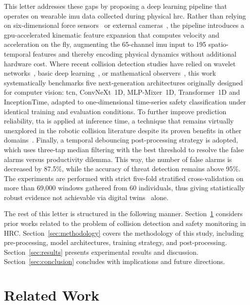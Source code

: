 \documentclass[letterpaper,journal]{IEEEtran}
\begin{document}
This letter addresses these gaps by proposing a deep learning pipeline that operates on wearable \ac{imu} data collected during physical \ac{hrc}. Rather than relying on six-dimensional force sensors~\cite{wang2025sixdof} or external cameras~\cite{hoang2024grasp}, the pipeline introduces a \ac{gpu}-accelerated kinematic feature expansion that computes velocity and acceleration on the fly, augmenting the 65-channel \ac{imu} input to 195 spatio-temporal features and thereby encoding physical dynamics without additional hardware cost. Where recent collision detection studies have relied on wavelet networks~\cite{niu2024wavelet}, basic deep learning~\cite{zhao2025zeroforce}, or mathematical observers~\cite{tonti2024eso}, this work systematically benchmarks five next-generation architectures originally designed for computer vision: \ac{tcn}, ConvNeXt~1D, MLP-Mixer~1D, Transformer~1D and InceptionTime, adapted to one-dimensional time-series safety classification under identical training and evaluation conditions. To further improve prediction reliability, \ac{tta} is applied at inference time, a technique that remains virtually unexplored in the robotic collision literature despite its proven benefits in other domains~\cite{fang2024multivariate}. Finally, a temporal debouncing post-processing strategy is adopted, which uses three-tap median filtering with the best threshold to resolve the false alarms versus productivity dilemma. This way, the number of false alarms is decreased by 87.5\%, while the accuracy of threat detection remains above 95\%. The experiments are performed with strict five-fold stratified cross-validation on more than 69,000 windows gathered from 60 individuals, thus giving statistically robust evidence not achievable via digital twins~\cite{an2024digitaltwin} alone.

The rest of this letter is structured in the following manner. Section~\ref{sec:related} considers prior works related to the problem of collision detection and safety monitoring in HRC. Section~\ref{sec:methodology} covers the methodology of this study, including pre-processing, model architectures, training strategy, and post-processing. Section~\ref{sec:results} presents experimental results and discussion. Section~\ref{sec:conclusion} concludes with implications and future directions.

\section{Related Work}\label{sec:related}
\end{document}

